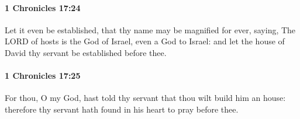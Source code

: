 		\paragraph{1 Chronicles 17:24} %
			\label{1CHRONICLES-17-24}

			Let it even be established, that thy name may be magnified for ever, saying, The LORD of hosts is the God of Israel, even a God to Israel: and let the house of David thy servant be established before thee.


		\paragraph{1 Chronicles 17:25} %
			\label{1CHRONICLES-17-25}

			For thou, O my God, hast told thy servant that thou wilt build him an house: therefore thy servant hath found in his heart to pray before thee.

